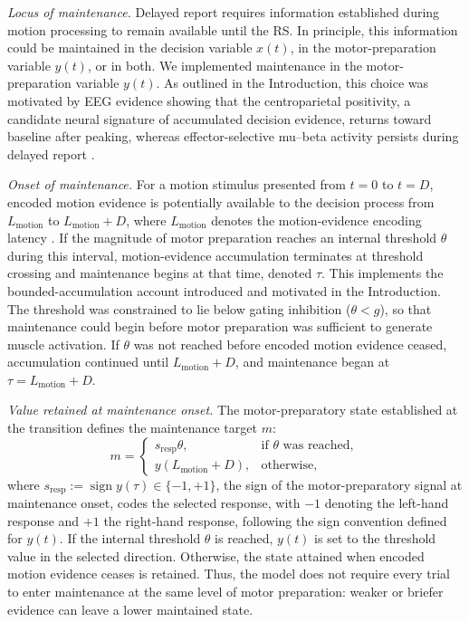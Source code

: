 \documentclass[a4paper,11pt]{article}
\theoremstyle{definition}
\newcommand{\1}{\mathbbm{1}}
\begin{document}
\emph{Locus of maintenance.} Delayed report requires information established during motion processing to remain available until the RS. In principle, this information could be maintained in the decision variable $x(t)$, in the motor-preparation variable $y(t)$, or in both. We implemented maintenance in the motor-preparation variable $y(t)$. As outlined in the Introduction, this choice was motivated by EEG evidence showing that the centroparietal positivity, a candidate neural signature of accumulated decision evidence, returns toward baseline after peaking, whereas effector-selective mu--beta activity persists during delayed report \parencites{roggeMotorCorticalSignals2022}{twomeyAbstractEffectorSelectiveDecision2016}.

\emph{Onset of maintenance.} For a motion stimulus presented from $t=0$ to $t=D$, encoded motion evidence is potentially available to the decision process from $L_{\mathrm{motion}}$ to $L_{\mathrm{motion}}+D$, where $L_{\mathrm{motion}}$ denotes the motion-evidence encoding latency \parencite[e.g.,][]{resulajChangesMindDecisionmaking2009}. If the magnitude of motor preparation reaches an internal threshold $\theta$ during this interval, motion-evidence accumulation terminates at threshold crossing and maintenance begins at that time, denoted $\tau$. This implements the bounded-accumulation account introduced and motivated in the Introduction. The threshold was constrained to lie below gating inhibition ($\theta<g$), so that maintenance could begin before motor preparation was sufficient to generate muscle activation. If $\theta$ was not reached before encoded motion evidence ceased, accumulation continued until $L_{\mathrm{motion}}+D$, and maintenance began at $\tau=L_{\mathrm{motion}}+D$.

\emph{Value retained at maintenance onset.} The motor-preparatory state established at the transition defines the maintenance target $m$:
\begin{equation}
m = \begin{cases} s_{\mathrm{resp}}\theta, & \text{if } \theta \text{ was reached},\\ y(L_{\mathrm{motion}}+D), & \text{otherwise},\end{cases}
\label{eq:m}
\end{equation}
where $s_{\mathrm{resp}}:=\operatorname{sign}y(\tau)\in\{-1,+1\}$, the sign of the motor-preparatory signal at maintenance onset, codes the selected response, with $-1$ denoting the left-hand response and $+1$ the right-hand response, following the sign convention defined for $y(t)$. If the internal threshold $\theta$ is reached, $y(t)$ is set to the threshold value in the selected direction. Otherwise, the state attained when encoded motion evidence ceases is retained. Thus, the model does not require every trial to enter maintenance at the same level of motor preparation: weaker or briefer evidence can leave a lower maintained state.
\end{document}

